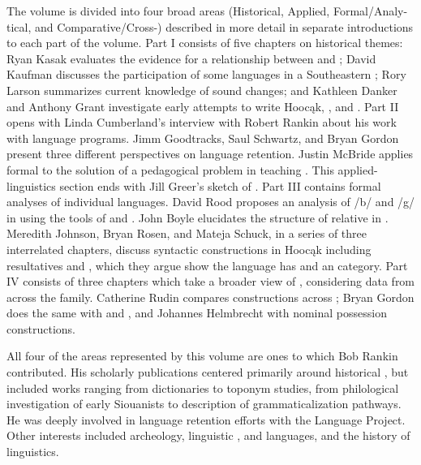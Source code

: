 \begin{refsection}
The volume is divided into four broad areas (Historical, Applied, Formal/Analy-tical, and Comparative/Cross-) described in more detail in separate introductions to each part of the volume. Part I consists of five chapters on historical themes: Ryan Kasak evaluates the evidence for a relationship between  and ; David Kaufman discusses the participation of some  languages in a Southeastern ; Rory Larson summarizes current knowledge of  sound changes; and Kathleen Danker and Anthony Grant investigate early attempts to write Hooc\k{a}k, , and .  Part II opens with Linda Cumberland's interview with Robert Rankin about his work with  language programs. Jimm Goodtracks, Saul Schwartz, and Bryan Gordon present three different perspectives on  language retention. Justin McBride applies formal  to the solution of a pedagogical problem in teaching . This applied-linguistics section ends with Jill Greer's sketch  of . Part III contains formal analyses of individual  languages. David Rood proposes an analysis of /b/ and /g/ in  using the tools of  and . John Boyle elucidates the structure of relative  in . Meredith Johnson, Bryan Rosen, and Mateja Schuck, in a series of three interrelated chapters, discuss syntactic constructions in Hooc\k{a}k including resultatives and  , which they argue show the language has  and an  category. Part IV consists of three chapters which take a broader view of , considering data from across the  family.  Catherine Rudin compares  constructions across ; Bryan Gordon does the same with  and , and Johannes Helmbrecht with nominal possession constructions. 

All four of the areas represented by this volume are ones to which Bob Rankin contributed. His scholarly publications centered primarily around  historical , but included works ranging from dictionaries to toponym studies, from philological investigation of early Siouanists  to description of grammaticalization pathways. He was deeply involved in language retention efforts with the  Language Project. Other interests included archeology, linguistic ,  and  languages, and the history of linguistics. 


\end{refsection}
